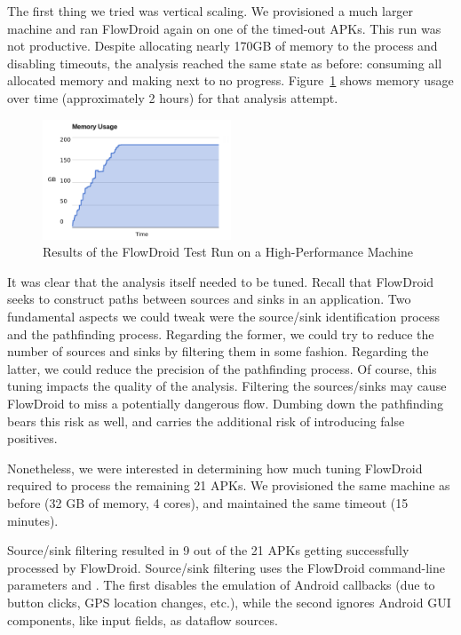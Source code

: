 The first thing we tried was vertical scaling.  We provisioned a much larger machine and ran FlowDroid again on one of the timed-out APKs.  This run was not productive.  Despite allocating nearly 170GB of memory to the process and disabling timeouts, the analysis reached the same state as before: consuming all allocated memory and making next to no progress.  Figure~\ref{fig:high_phase1} shows memory usage over time (approximately 2 hours) for that analysis attempt.

\begin{figure}[h]
	\centering
	\includegraphics[width=0.50\textwidth]{flowdroid_perf.pdf}
	\caption{Results of the FlowDroid Test Run on a High-Performance Machine}
	\label{fig:high_phase1}
\end{figure}

It was clear that the analysis itself needed to be tuned.  Recall that FlowDroid seeks to construct paths between sources and sinks in an application.  Two fundamental aspects we could tweak were the source/sink identification process and the pathfinding process.  Regarding the former, we could try to reduce the number of sources and sinks by filtering them in some fashion.  Regarding the latter, we could reduce the precision of the pathfinding process.  Of course, this tuning impacts the quality of the analysis.  Filtering the sources/sinks may cause FlowDroid to miss a potentially dangerous flow.  Dumbing down the pathfinding bears this risk as well, and carries the additional risk of introducing false positives. 

Nonetheless, we were interested in determining how much tuning FlowDroid required to process the remaining 21 APKs.  We provisioned the same machine as before (32 GB of memory, 4 cores), and maintained the same timeout (15 minutes).  

Source/sink filtering resulted in 9 out of the 21 APKs getting successfully processed by FlowDroid. Source/sink filtering uses the FlowDroid command-line parameters  and . The first disables the emulation of Android callbacks (due to button clicks, GPS location changes, etc.), while the second ignores Android GUI components, like input fields, as dataflow sources.

